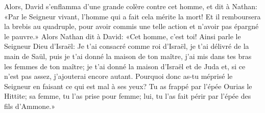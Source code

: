 Alors, David s’enflamma d’une grande colère contre cet homme, et dit à Nathan:
	«Par le Seigneur vivant, l’homme qui a fait cela mérite la mort!
Et il remboursera la brebis au quadruple,
	pour avoir commis une telle action et n’avoir pas épargné le pauvre.»
Alors Nathan dit à David:
	«Cet homme, c’est toi!
Ainsi parle le Seigneur Dieu d’Israël:
	Je t’ai consacré comme roi d’Israël, je t’ai délivré de la main de Saül,
	puis je t’ai donné la maison de ton maître,
	j’ai mis dans tes bras les femmes de ton maître;
	je t’ai donné la maison d’Israël et de Juda
	et, si ce n’est pas assez, j’ajouterai encore autant.
Pourquoi donc as-tu méprisé le Seigneur en faisant ce qui est mal à ses yeux?
Tu as frappé par l’épée Ourias le Hittite; sa femme, tu l’as prise pour femme;
	lui, tu l’as fait périr par l’épée des fils d’Ammone.»
